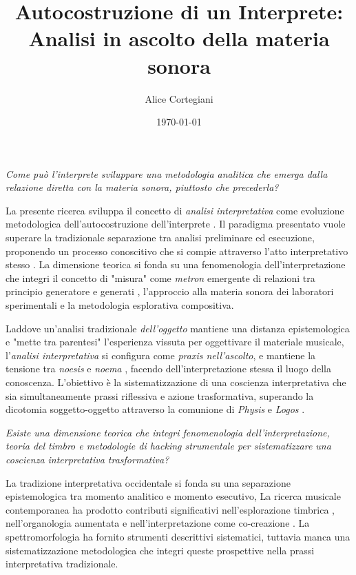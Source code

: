 \documentclass[11pt]{article}
\title{\textbf{Autocostruzione di un Interprete:\\Analisi in ascolto della materia sonora}}
\author{Alice Cortegiani}
\date{\today}
\begin{document}
\maketitle

\emph{Come può l'interprete sviluppare una metodologia analitica che emerga dalla relazione diretta con la materia sonora, piuttosto che precederla?}

La presente ricerca sviluppa il concetto di \textit{analisi interpretativa} come evoluzione metodologica dell'autocostruzione dell'interprete \citep{cortegiani2024adi}. Il paradigma presentato vuole superare la tradizionale separazione tra analisi preliminare ed esecuzione, proponendo un processo conoscitivo che si compie attraverso l'atto interpretativo stesso \citep{hatten2021speculative}. La dimensione teorica si fonda su una fenomenologia dell'interpretazione \citep{rognoni1966fenomenologia, ihde2007listening, merleau-ponty1945phenomenologie} che integri il concetto di "misura" come \textit{metron} emergente di relazioni tra principio generatore e generati \citep{cacciari1996metafisica}, l'approccio alla materia sonora dei laboratori sperimentali e la metodologia esplorativa compositiva. 

Laddove un'analisi tradizionale \emph{dell'oggetto} mantiene una distanza epistemologica e "mette tra parentesi" l'esperienza vissuta per oggettivare il materiale musicale, l'\textit{analisi interpretativa} si configura come \emph{praxis nell'ascolto}, %
e mantiene la tensione tra \emph{noesis} e \emph{noema} \citep{husserl1913ideen}, facendo dell'interpretazione stessa il luogo della conoscenza. L'obiettivo è la sistematizzazione di una coscienza interpretativa che sia simultaneamente prassi riflessiva e azione trasformativa, superando la dicotomia soggetto-oggetto attraverso la comunione di \textit{Physis} e \textit{Logos} \citep{cacciari1991labirinto}.

\emph{Esiste una dimensione teorica che integri fenomenologia dell'interpretazione, teoria del timbro e metodologie di hacking strumentale per sistematizzare una coscienza interpretativa trasformativa?}

La tradizione interpretativa occidentale si fonda su una separazione epistemologica tra momento analitico e momento esecutivo, %
La ricerca musicale contemporanea ha prodotto contributi significativi nell'esplorazione timbrica \citep{mcadams2022perception}, nell'organologia aumentata \citep{magnusson2009hermeneutic, lupone2003feedback} e nell'interpretazione come co-creazione \citep{guaccero1970improvvisazione}. La spettromorfologia \citep{smalley1997spectromorphology} ha fornito strumenti descrittivi sistematici, tuttavia manca una sistematizzazione metodologica che integri queste prospettive nella prassi interpretativa tradizionale.
\end{document}
